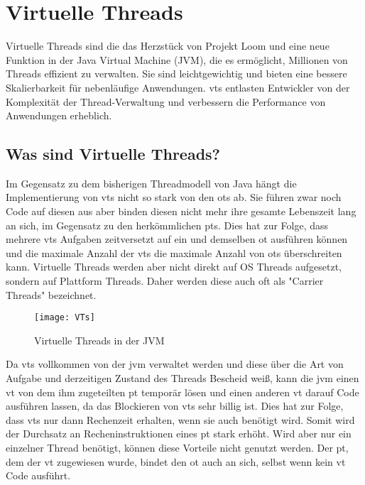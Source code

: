\section{Virtuelle Threads}                                 %
\label{sec:VirtuelleThreads}

Virtuelle Threads sind die das Herzstück von Projekt Loom und eine neue Funktion in der Java Virtual Machine (JVM), die es ermöglicht, Millionen von Threads effizient zu verwalten.
Sie sind leichtgewichtig und bieten eine bessere Skalierbarkeit für nebenläufige Anwendungen.
\Glspl{vt} entlasten Entwickler von der Komplexität der Thread-Verwaltung und verbessern die Performance von Anwendungen erheblich.


\subsection{Was sind Virtuelle Threads?}
\label{subsec:WassindVTs?}

    Im Gegensatz zu dem bisherigen Threadmodell von Java hängt die Implementierung von \Glspl{vt} nicht so stark von den \Glspl{ot} ab. Sie führen zwar noch Code 
    auf diesen aus aber binden diesen nicht mehr ihre gesamte Lebenszeit lang an sich, im Gegensatz zu den herkömmlichen \Glspl{pt}. Dies hat zur Folge, 
    dass mehrere \Glspl{vt} Aufgaben zeitversetzt auf ein und demselben \gls{ot} ausführen können und die maximale Anzahl der \Glspl{vt}
    die maximale Anzahl von \Glspl{ot} überschreiten kann.
    Virtuelle Threads werden aber nicht direkt auf OS Threads aufgesetzt, sondern auf Plattform Threads.
    Daher werden diese auch oft als "Carrier Threads" bezeichnet.
    \cite{ieee2022}

    \begin{figure}[H]
        \centering
        \texttt{[image: VTs]}
        \caption{Virtuelle Threads in der JVM}
        \label{fig:VTs}
    \end{figure}

    Da \Glspl{vt} vollkommen von der \gls{jvm} verwaltet werden und diese über die Art von Aufgabe und derzeitigen Zustand des Threads Bescheid weiß, kann die
    \gls{jvm} einen \gls{vt} von dem ihm zugeteilten \gls{pt} temporär lösen und einen anderen \gls{vt} darauf Code ausführen lassen, da das Blockieren von \Glspl{vt}
    sehr billig ist. Dies hat zur Folge, dass \Glspl{vt} nur dann Rechenzeit erhalten, wenn sie auch benötigt wird. Somit wird der Durchsatz an Recheninstruktionen
    eines \gls{pt} stark erhöht.
    Wird aber nur ein einzelner Thread benötigt, können diese Vorteile nicht genutzt werden. Der \gls{pt}, dem der \gls{vt} zugewiesen wurde, bindet den \gls{ot} auch
    an sich, selbst wenn kein \gls{vt} Code ausführt.
    \cite{JEP444}

